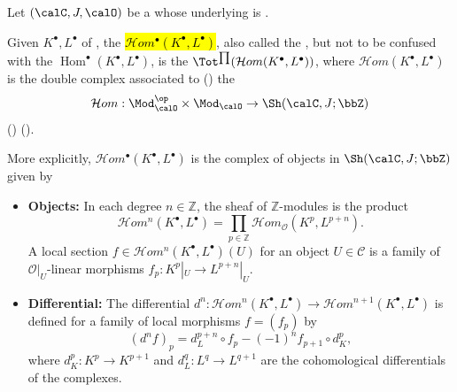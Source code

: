 \begin{definition} \label{definition:sheaf_internal_hom_functor_of_complexes_of_modules_on_an_essentially_small_ringed_site_with_a_pretopology}
    Let $(\calC, J, \calO)$ be a  whose underlying  is .

    Given  $K^\bullet, L^\bullet$ of , the  \hl{$\mathcal{H}om^\bullet(K^\bullet, L^\bullet)$}, also called the , but not to be confused with the  $\operatorname{Hom}^\bullet(K^\bullet, L^\bullet)$, is the  $\Tot^{\prod}(\mathcal{H}om(K^\bullet, L^\bullet))$, where $\mathcal{H}om(K^\bullet, L^\bullet)$ is the double complex associated to () the  $$\mathcal{H}om: \Mod_{\calO}^{\op} \times \Mod_{\calO} \to \Sh(\calC, J; \bbZ)$$ 
    () ().

    More explicitly, $\mathcal{H}om^\bullet(K^\bullet, L^\bullet)$ is the complex of objects in $\Sh(\calC, J; \bbZ)$ given by 
    \begin{itemize}
        \item \textbf{Objects:} In each degree $n \in \mathbb{Z}$, the sheaf of $\mathbb{Z}$-modules is the product
        $$ \mathcal{H}om^n(K^\bullet, L^\bullet) = \prod_{p \in \mathbb{Z}} \mathcal{H}om_{\mathcal{O}}(K^p, L^{p+n}). $$
        A local section $f \in \mathcal{H}om^n(K^\bullet, L^\bullet)(U)$ for an object $U \in \mathcal{C}$ is a family of $\mathcal{O}|_U$-linear morphisms $f_p: K^p|_U \to L^{p+n}|_U$.
        \item \textbf{Differential:} The differential $d^n: \mathcal{H}om^n(K^\bullet, L^\bullet) \to \mathcal{H}om^{n+1}(K^\bullet, L^\bullet)$ is defined for a family of local morphisms $f = (f_p)$ by 
        $$ (d^n f)_p = d_L^{p+n} \circ f_p - (-1)^n f_{p+1} \circ d_K^p, $$
        where $d_K^p: K^p \to K^{p+1}$ and $d_L^q: L^q \to L^{q+1}$ are the cohomological differentials of the complexes.
    \end{itemize}
\end{definition}